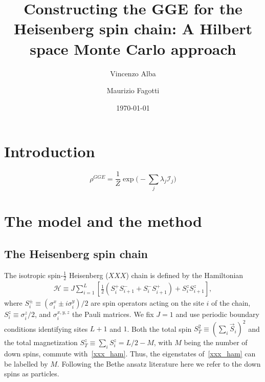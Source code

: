 \documentclass[twocolumn,superscriptaddress,prb,10pt]{revtex4-1}
\begin{document}
\title{Constructing the GGE for the Heisenberg spin chain: A Hilbert space Monte Carlo 
approach} 

\author{Vincenzo Alba}

\author{Maurizio Fagotti}

\date{\today}




\begin{abstract} 


\end{abstract}


\maketitle


\section{Introduction}


%
\begin{equation}
\rho^{GGE}=\frac{1}{Z}\exp\Big(-\sum_j\lambda_j{\mathcal I}_j\Big)
\label{gge}
\end{equation}
%

\section{The model and the method}

\subsection{The Heisenberg spin chain}

The isotropic spin-$\frac{1}{2}$ Heisenberg ($XXX$) chain is defined by the 
Hamiltonian 
%
\begin{align}
\label{xxx_ham}
{\mathcal H}\equiv J\sum\limits_{i=1}^L\left[\frac{1}{2}(S_i^+S^-_{i+1} 
+S_i^{-}S_{i+1}^+)+S_i^zS_{i+1}^z\right],  
\end{align}
%
where $S^{\pm}_i\equiv (\sigma_i^x\pm i\sigma_i^y)/2$ are spin operators 
acting on the site $i$ of the chain, $S_i^z\equiv\sigma_i^z/2$, and 
$\sigma^{x,y,z}_i$ the Pauli matrices. We fix $J=1$ and use periodic 
boundary conditions identifying sites $L+1$ and $1$. 
Both the total spin $S_T^2\equiv(\sum_i \vec S_i)^2$ and the total 
magnetization $S_{T}^z\equiv\sum_iS_i^z=L/2-M$, with $M$ being the 
number of down spins, commute with~\eqref{xxx_ham}. Thus, the 
eigenstates of~\eqref{xxx_ham} can be labelled by $M$. Following the 
Bethe ansatz literature here we refer to the down spins as particles. 
\end{document}
